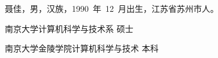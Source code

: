 \documentclass[twoside, master]{NJUthesis}
\theoremstyle{plain}
\begin{document}









\vspace{1ex}
\noindent 聂佳，男，汉族，1990~年~12~月出生，江苏省苏州市人。
\vspace{2ex}

\begin{description}[labelindent=0em, leftmargin=8em, style=sameline]
\item[2013.9～2016.6] 南京大学计算机科学与技术系 \hfill 硕士
\item[2009.9～2013.6] 南京大学金陵学院计算机科学与技术 \hfill 本科
\end{description}
\end{document}
